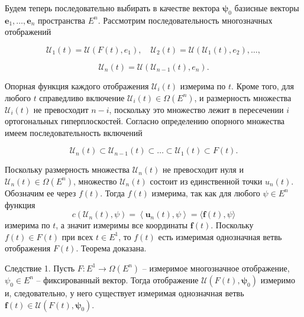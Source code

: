 \documentclass[8pt]{extarticle}
\begin{document}
Будем теперь последовательно выбирать в качестве вектора \({\mathbf{\psi }}_{0}\) базисные векторы \({\mathbf{e}}_{1},\ldots,{\mathbf{e}}_{n}\) пространства \({E}^{n}\). Рассмотрим последовательность многозначных отображений

\[
{\mathcal{U}}_{1}\left( t\right) = \mathcal{U}\left( {F\left( t\right) ,{e}_{1}}\right),\quad
{\mathcal{U}}_{2}\left( t\right) = \mathcal{U}\left( {{\mathcal{U}}_{1}\left( t\right) ,{e}_{2}}\right),\ldots,
\]

\[
{\mathcal{U}}_{n}\left( t\right) = \mathcal{U}\left( {{\mathcal{U}}_{n - 1}\left( t\right) ,{e}_{n}}\right).
\]

Опорная функция каждого отображения \({\mathcal{U}}_{i}\left( t\right)\) измерима по \(t\). Кроме того, для любого \(t\) справедливо включение \({\mathcal{U}}_{i}\left( t\right) \in \Omega \left( {E}^{n}\right)\), и размерность множества \({\mathcal{U}}_{i}\left( t\right)\) не превосходит \(n - i\), поскольку это множество лежит в пересечении \(i\) ортогональных гиперплоскостей. Согласно определению опорного множества имеем последовательность включений

\[
{\mathcal{U}}_{n}\left( t\right) \subset {\mathcal{U}}_{n - 1}\left( t\right) \subset \ldots \subset {\mathcal{U}}_{1}\left( t\right) \subset F\left( t\right).
\]

Поскольку размерность множества \({\mathcal{U}}_{n}\left( t\right)\) не превосходит нуля и \({\mathcal{U}}_{n}\left( t\right) \in \Omega \left( {E}^{n}\right)\), множество \({\mathcal{U}}_{n}\left( t\right)\) состоит из единственной точки \({u}_{n}\left( t\right)\). Обозначим ее через \(f\left( t\right)\). Тогда \(f\left( t\right)\) измерима, так как для любого \(\psi \in {E}^{n}\) функция
\[
c\left( {{\mathcal{U}}_{n}\left( t\right) ,\psi }\right) = \left\langle {{\mathbf{u}}_{n}\left( t\right),\psi}\right\rangle = \langle \mathbf{f}\left( t\right),\psi\rangle
\]
измерима по \(t\), а значит измеримы все координаты \(\mathbf{f}\left( t\right)\). Поскольку \(f\left( t\right) \in F\left( t\right)\) при всех \(t \in {E}^{1}\), то \(f\left( t\right)\) есть измеримая однозначная ветвь отображения \(F\left( t\right)\). Теорема доказана.

Следствие 1. Пусть \(F : {E}^{1} \rightarrow \Omega \left( {E}^{n}\right)\) -- измеримое многозначное отображение, \({\psi }_{0} \in {E}^{n}\) -- фиксированный вектор. Тогда отображение \(\mathcal{U}\left( {F\left( t\right),{\mathbf{\psi }}_{0}}\right)\) измеримо и, следовательно, у него существует измеримая однозначная ветвь \(\mathbf{f}\left( t\right) \in \mathcal{U}\left( {F\left( t\right),{\mathbf{\psi }}_{0}}\right)\).
\end{document}
